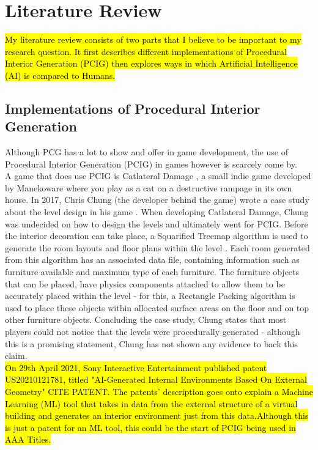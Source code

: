 \section{Literature Review}
\hl{My literature review consists of two parts that I believe to be important to my research question. It first describes different implementations of Procedural Interior Generation (PCIG) then explores ways in which Artificial Intelligence (AI) is compared to Humans.}

\subsection{Implementations of Procedural Interior Generation}
Although PCG has a lot to show and offer in game development, the use of Procedural Interior Generation (PCIG) in games however is scarcely come by.
\\
A game that does use PCIG is Catlateral Damage \cite{game:catlateral},
a small indie game developed by Manekoware where you play as a cat on a destructive rampage 
in its own house. In 2017, Chris Chung (the developer behind the game) wrote a case study about the level design in his game \cite[Chapter~6]{pcg_in_gd}. When developing Catlateral Damage, Chung was undecided on how to design the levels and ultimately went for PCIG\cite[Chapter~6]{pcg_in_gd}. Before the interior decoration can take place, a Squarified Treemap algorithm is used to generate the room layouts and floor plans within the level \cite{squarified-treemap}. Each room generated from this algorithm has an associated data file, containing information such as furniture available and maximum type of each furniture. The furniture objects that can be placed, have physics components attached to allow them to be accurately placed within the level - for this, a Rectangle Packing algorithm \cite{rectangle-packing} is used to place these objects within allocated surface areas on the floor and on top other furniture objects. Concluding the case study, Chung states that most players could not notice that the levels were procedurally generated - although this is a promising statement, Chung has not shown any evidence to back this claim.
\\
\hl{On 29th April 2021, Sony Interactive Entertainment published patent US20210121781, titled "AI-Generated Internal Environments Based On External Geometry" CITE PATENT. The patents' description goes onto explain a Machine Learning (ML) tool that takes in data from the external structure of a virtual building and generates an interior environment just from this data.Although this is just a patent for an ML tool, this could be the start of PCIG being used in AAA Titles.}
\bigskip


